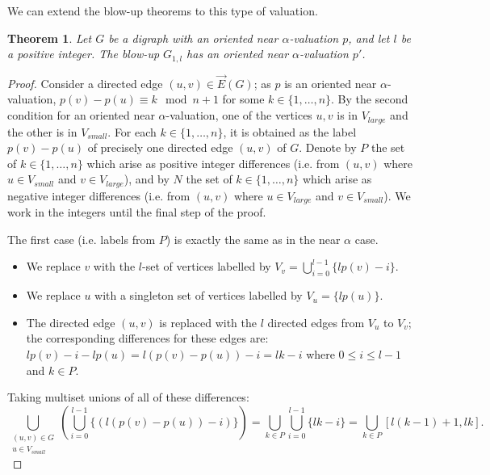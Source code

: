 \documentclass[12pt, a4paper]{article}
\newtheorem{theorem}{Theorem}[section]
\theoremstyle{definition}
\begin{document}
We can extend the blow-up theorems to this type of valuation.  

\begin{theorem}\label{orblowlarge}
    Let $G$ be a digraph with an oriented near $\alpha$-valuation $p$, and let $l$ be a positive integer. The blow-up $G_{1,l}$ has an oriented near $\alpha$-valuation $p'$.
\end{theorem}
\begin{proof}
Consider a directed edge $(u,v) \in \overrightarrow{E}(G)$; as $p$ is an oriented near $\alpha$-valuation, $p(v)-p(u) \equiv k \mod n+1$
for some $k\in \{1,\ldots,n\}$.  By the second condition for an oriented near $\alpha$-valuation, one of the vertices $u,v$ is in $V_{large}$ and the other is in $V_{small}$. For each $k \in \{1,\ldots,n\}$, it is obtained as the label $p(v)-p(u)$ of precisely one directed edge $(u,v)$ of $G$.  Denote by $P$ the set of $k\in \{1,\ldots,n\}$ which arise as positive integer differences (i.e. from $(u,v)$ where $u \in V_{small}$ and $v \in V_{large}$), and by $N$ the set of $k \in \{1,\ldots,n\}$ which arise as negative integer differences (i.e. from $(u,v)$ where $u \in V_{large}$ and $v \in V_{small}$).  We work in the integers until the final step of the proof.  

The first case (i.e. labels from $P$) is exactly the same as in the near $\alpha$ case. 
\begin{itemize}
\item We replace $v$ with the $l$-set of vertices labelled by $V_v=\bigcup_{i=0}^{l-1}\{lp(v)-i\}$.
\item We replace $u$ with a singleton set of vertices labelled by $V_u = \{lp(u)\}$.
\item The directed edge $(u,v)$ is replaced with the $l$ directed edges from $V_u$ to $V_v$; the corresponding differences for these edges are:
$lp(v)-i-lp(u) =  l(p(v)-p(u))-i = lk-i$
where $0 \leq i \leq l-1$ and $k \in P$. 
\end{itemize}

Taking multiset unions of all of these differences:
\[
\bigcup_{\substack{(u,v) \in G \\ u \in V_{small}}} \left( \bigcup_{i=0}^{l-1} \{ (l(p(v)-p(u))-i) \} \right)
= \bigcup_{k\in P} \bigcup_{i=0}^{l-1} \{ lk-i \} = \bigcup_{k \in P}[l(k-1)+1,lk]. 
\]


\end{proof}
\end{document}
